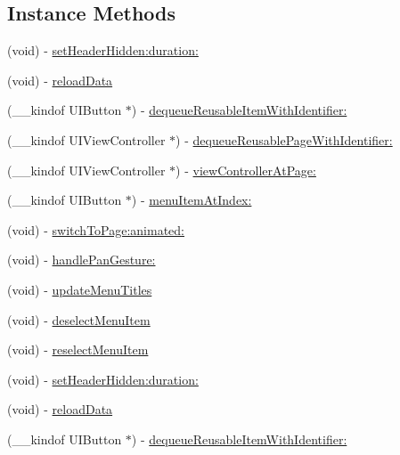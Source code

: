 \subsection*{Instance Methods}
\begin{DoxyCompactItemize}
\item 
(void) -\/ \mbox{\hyperlink{interface_v_t_magic_view_ac8808d94ff7db43424b201f33935c488}{set\+Header\+Hidden\+:duration\+:}}
\item 
(void) -\/ \mbox{\hyperlink{interface_v_t_magic_view_a2b4be574c1455324b75320267d6a570b}{reload\+Data}}
\item 
(\+\_\+\+\_\+kindof U\+I\+Button $\ast$) -\/ \mbox{\hyperlink{interface_v_t_magic_view_acf5bd2bc5f86d5ee19f77abb4f5fe41d}{dequeue\+Reusable\+Item\+With\+Identifier\+:}}
\item 
(\+\_\+\+\_\+kindof U\+I\+View\+Controller $\ast$) -\/ \mbox{\hyperlink{interface_v_t_magic_view_a5bb11ea7692fa50a93f57c6d25a69158}{dequeue\+Reusable\+Page\+With\+Identifier\+:}}
\item 
(\+\_\+\+\_\+kindof U\+I\+View\+Controller $\ast$) -\/ \mbox{\hyperlink{interface_v_t_magic_view_a0517e982834f1cebdb4f497b7c5d2706}{view\+Controller\+At\+Page\+:}}
\item 
(\+\_\+\+\_\+kindof U\+I\+Button $\ast$) -\/ \mbox{\hyperlink{interface_v_t_magic_view_a20cac7e2a625740dcdceaee4acaaad8d}{menu\+Item\+At\+Index\+:}}
\item 
(void) -\/ \mbox{\hyperlink{interface_v_t_magic_view_a419f8745d0c6afd26f97b782a643426e}{switch\+To\+Page\+:animated\+:}}
\item 
(void) -\/ \mbox{\hyperlink{interface_v_t_magic_view_a3c17ac83f0b9c1bf684852d60d3f4766}{handle\+Pan\+Gesture\+:}}
\item 
(void) -\/ \mbox{\hyperlink{interface_v_t_magic_view_a87cfe336988bf4d06aa52c3e1bbef132}{update\+Menu\+Titles}}
\item 
(void) -\/ \mbox{\hyperlink{interface_v_t_magic_view_a0e92cac6b3957cfc432779b9e9fd953f}{deselect\+Menu\+Item}}
\item 
(void) -\/ \mbox{\hyperlink{interface_v_t_magic_view_afd5ddee2cccae141176cd44b737f9444}{reselect\+Menu\+Item}}
\item 
(void) -\/ \mbox{\hyperlink{interface_v_t_magic_view_ac8808d94ff7db43424b201f33935c488}{set\+Header\+Hidden\+:duration\+:}}
\item 
(void) -\/ \mbox{\hyperlink{interface_v_t_magic_view_a2b4be574c1455324b75320267d6a570b}{reload\+Data}}
\item 
(\+\_\+\+\_\+kindof U\+I\+Button $\ast$) -\/ \mbox{\hyperlink{interface_v_t_magic_view_a53dd4f1868c19fcc9a8fcce1cefb41f8}{dequeue\+Reusable\+Item\+With\+Identifier\+:}}

\end{DoxyCompactItemize}
